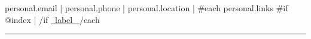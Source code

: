 \documentclass[10pt,a4paper]{article}
\begin{document}
\color{dark}


{\fontsize{25}{28}\selectfont
\bfseries{}\par}

\vspace{4pt}

{\small
{{personal.email}}
\quad | \quad
{{personal.phone}}
\quad | \quad
{{personal.location}}
\quad | \quad
{{#each personal.links}}
{{#if @index}}
\quad | \quad
{{/if}}
\href{ {{~url~}} }{\textcolor{accent}{ {{~label~}} }}
{{/each}}
\par}

\vspace{2pt}

{\color{accent}\rule{\textwidth}{1.2pt}}

\vspace{2pt}


\setlength{\columnsep}{0.28in}
\end{document}
